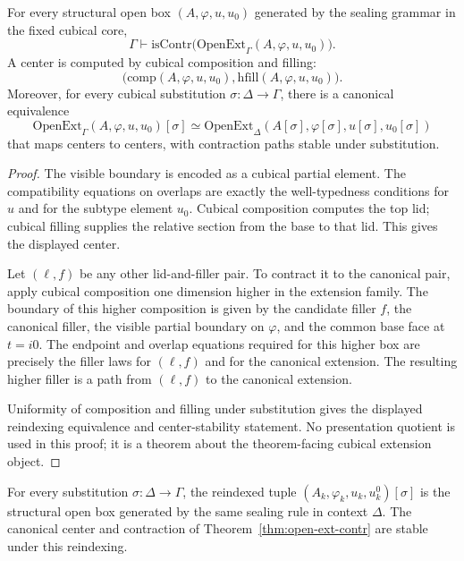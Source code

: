 \begin{theorem}
\label{thm:open-ext-contr}
For every structural open box \((A,\varphi,u,u_0)\) generated by the sealing grammar in the
fixed cubical core,
\[
  \Gamma \vdash
  \mathrm{isContr}\bigl(\mathrm{OpenExt}_{\Gamma}(A,\varphi,u,u_0)\bigr).
\]
A center is computed by cubical composition and filling:
\[
  \bigl(\mathrm{comp}(A,\varphi,u,u_0),
        \mathrm{hfill}(A,\varphi,u,u_0)\bigr).
\]
Moreover, for every cubical substitution \(\sigma:\Delta\to\Gamma\), there is a canonical
equivalence
\[
  \mathrm{OpenExt}_{\Gamma}(A,\varphi,u,u_0)[\sigma]
  \simeq
  \mathrm{OpenExt}_{\Delta}(A[\sigma],\varphi[\sigma],u[\sigma],u_0[\sigma])
\]
that maps centers to centers, with contraction paths stable under substitution.
\end{theorem}

\begin{proof}
The visible boundary is encoded as a cubical partial element.  The compatibility equations on
overlaps are exactly the well-typedness conditions for \(u\) and for the subtype element
\(u_0\).  Cubical composition computes the top lid; cubical filling supplies the relative
section from the base to that lid.  This gives the displayed center.

Let \((\ell,f)\) be any other lid-and-filler pair.  To contract it to the canonical pair, apply
cubical composition one dimension higher in the extension family.  The boundary of this
higher composition is given by the candidate filler \(f\), the canonical filler, the visible
partial boundary on \(\varphi\), and the common base face at \(t=i0\).  The endpoint and
overlap equations required for this higher box are precisely the filler laws for \((\ell,f)\)
and for the canonical extension.  The resulting higher filler is a path from \((\ell,f)\) to
the canonical extension.

Uniformity of composition and filling under substitution gives the displayed reindexing
equivalence and center-stability statement.  No presentation quotient is used in this proof;
it is a theorem about the theorem-facing cubical extension object.
\end{proof}

\begin{lemma}
\label{lem:open-box-substitution}
For every substitution \(\sigma:\Delta\to\Gamma\), the reindexed tuple
\((A_k,\varphi_k,u_k,u^0_k)[\sigma]\) is the structural open box generated by the same
sealing rule in context \(\Delta\).  The canonical center and contraction of
Theorem~\ref{thm:open-ext-contr} are stable under this reindexing.
\end{lemma}

